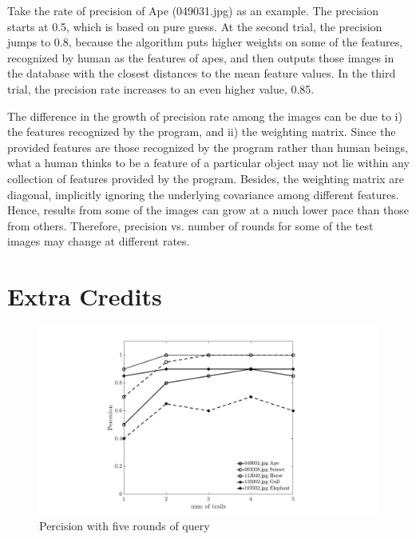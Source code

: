 \documentclass{article}
\begin{document}
	Take the rate of precision of Ape (049031.jpg) as an example. The precision starts at 0.5, which is based on pure guess. At the second trial, the precision jumps to 0.8, because the algorithm puts higher weights on some of the features, recognized by human as the features of apes, and then outputs those images in the database with the closest distances to the mean feature values. In the third trial, the precision rate increases to an even higher value, 0.85.
	
	\justify The difference in the growth of precision rate among the images can be due to i) the features recognized by the program, and ii) the weighting matrix. Since the provided features are those recognized by the program rather than human beings, what a human thinks to be a feature of a particular object may not lie within any collection of features provided by the program. Besides, the weighting matrix are diagonal, implicitly ignoring the underlying covariance among different features. Hence, results from some of the images can grow at a much lower pace than those from others. Therefore, precision vs. number of rounds for some of the test images may change at different rates. 
	
	
	\section{Extra Credits}
		\begin{figure}[H]
			\centering
			\includegraphics[width=\linewidth]{extra_credit}
			\caption{Percision with five rounds of query}
			\label{fig: 2}
		\end{figure}
		

        
\end{document}
